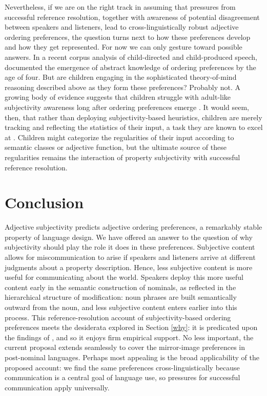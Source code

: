 \documentclass{sp}
\begin{document}
Nevertheless, if we are on the right track in assuming that pressures from successful reference resolution, together with awareness of potential disagreement between speakers and listeners, lead to cross-linguistically robust adjective ordering preferences, the question turns next to how these preferences develop and how they get represented. For now we can only gesture toward possible answers. In a recent corpus analysis of child-directed and child-produced speech, \cite{barseveretal2018} documented the emergence of abstract knowledge of ordering preferences by the age of four. But are children engaging in the sophisticated theory-of-mind reasoning described above as they form these preferences? Probably not. A growing body of evidence suggests that children struggle with adult-like subjectivity awareness long after ordering preferences emerge \citep{fousheesrinivasan2017}. It would seem, then, that rather than deploying subjectivity-based heuristics, children are merely tracking and reflecting the statistics of their input, a task they are known to excel at \citep[e.g.,][]{saffranetal1996}. Children might categorize the regularities of their input according to semantic classes or adjective function, but the ultimate source of these regularities remains the interaction of property subjectivity with successful reference resolution. 


\section{Conclusion} \label{conclusion}

Adjective subjectivity predicts adjective ordering preferences, a remarkably stable property of language design. We have offered an answer to the question of why subjectivity should play the role it does in these preferences. Subjective content allows for miscommunication to arise if speakers and listeners arrive at different judgments about a property description. Hence, less subjective content is more useful for communicating about the world. Speakers deploy this more useful content early in the semantic construction of nominals, as reflected in the hierarchical structure of modification: noun phrases are built semantically outward from the noun, and less subjective content enters earlier into this process. This reference-resolution account of subjectivity-based ordering preferences meets the desiderata explored in Section \ref{why}: it is predicated upon the findings of \cite{scontrasetal2017adjectives}, and so it enjoys firm empirical support. No less important, the current proposal extends seamlessly to cover the mirror-image preferences in post-nominal languages. Perhaps most appealing is the broad applicability of the proposed account: we find the same preferences cross-linguistically because communication is a central goal of language use, so pressures for successful communication apply universally.
\end{document}
